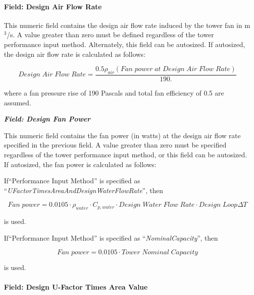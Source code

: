 \paragraph{Field: Design Air Flow Rate}\label{field-design-air-flow-rate}

This numeric field contains the design air flow rate induced by the tower fan in m\(^{3}\)/s. A value greater than zero must be defined regardless of the tower performance input method. Alternately, this field can be autosized. If autosized, the design air flow rate is calculated as follows:

\begin{equation}
Design\;Air\;Flow\;Rate = \frac{{0.5{\rho_{air}}(Fan\;power\;at\;Design\;Air\;Flow\;Rate)}}{{190.}}
\end{equation}

where a fan pressure rise of 190 Pascals and total fan efficiency of 0.5 are assumed.

\textbf{\emph{Field: Design Fan Power}}

This numeric field contains the fan power (in watts) at the design air flow rate specified in the previous field. A value greater than zero must be specified regardless of the tower performance input method, or this field can be autosized. If autosized, the fan power is calculated as follows:

If``Performance Input Method'' is specified as ``\emph{UFactorTimesAreaAndDesignWaterFlowRate}'', then

\begin{equation}
Fan\;power = 0.0105\cdot {\rho_{water}}\cdot {C_{p,water}}\cdot Design\;Water\;Flow\;Rate\cdot Design\;Loop\Delta T
\end{equation}

is used.

If``Performance Input Method'' is specified as ``\emph{NominalCapacity}'', then

\begin{equation}
Fan\;power = 0.0105\cdot Tower\;Nominal\;Capacity
\end{equation}

is used.

\paragraph{Field: Design U-Factor Times Area Value}\label{field-design-u-factor-times-area-value}

